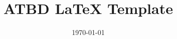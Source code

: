\newcommand{\ATBDTitle}{ATBD \LaTeX{} Template}
\newcommand{\Introduction}{Intro Lorem Ipsum Text}
\newcommand{\HistoricalPerspective}{Historical Perspective Lorem Ipsum Text}
\newcommand{\AlgDesc}{
Some other text 
\begin{equation} \int_0^\infty x^2 dx 
\end{equation} Plus some more text
}
\newcommand{\AlgorithmOutputVariables}{\variableTable{None & None \\}}
\newcommand{\variableTable}[1]{
\begin{center}
\begin{tabular} { | p{9cm}  | p{3cm} | } 
 \hline
 \textbf{Long Name} & \textbf{Unit} \\
 \hline
#1
 \hline
\end{tabular}
\end{center}
}

\newcommand{\AlgorithmUsageConstraints}{Alg Usage Lorem Ipsum Text}

\title{\ATBDTitle}
\date{\today}

\documentclass[12pt]{article}

\usepackage{color}   %
\usepackage{hyperref}
\usepackage{booktabs}
\hypersetup{
    colorlinks=true, %
    linktoc=all,     %
    linkcolor=blue,  %
}


\maketitle

\tableofcontents

\section{Introduction}
\Introduction

\section{Historical Perspective}
\HistoricalPerspective

\section{Algorithm Description}
\AlgDesc

\subsection{Scientific Theory}
\ScientificTheory


